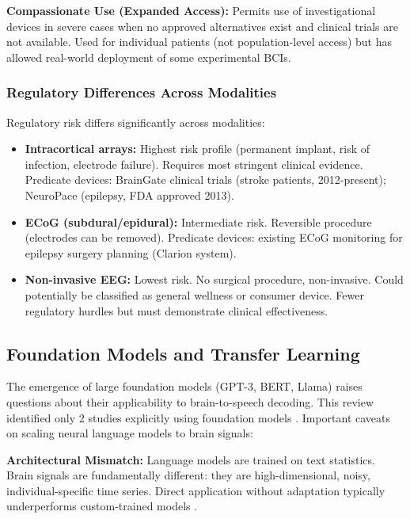 \textbf{Compassionate Use (Expanded Access):} Permits use of investigational devices in severe cases when no approved alternatives exist and clinical trials are not available. Used for individual patients (not population-level access) but has allowed real-world deployment of some experimental BCIs.

\subsubsection{Regulatory Differences Across Modalities}

Regulatory risk differs significantly across modalities:

\begin{itemize}
    \item \textbf{Intracortical arrays:} Highest risk profile (permanent implant, risk of infection, electrode failure). Requires most stringent clinical evidence. Predicate devices: BrainGate clinical trials (stroke patients, 2012-present); NeuroPace (epilepsy, FDA approved 2013).
    
    \item \textbf{ECoG (subdural/epidural):} Intermediate risk. Reversible procedure (electrodes can be removed). Predicate devices: existing ECoG monitoring for epilepsy surgery planning (Clarion system).
    
    \item \textbf{Non-invasive EEG:} Lowest risk. No surgical procedure, non-invasive. Could potentially be classified as general wellness or consumer device. Fewer regulatory hurdles but must demonstrate clinical effectiveness.
\end{itemize}

\subsection{Foundation Models and Transfer Learning}
\label{sec:foundation_models}

The emergence of large foundation models (GPT-3, BERT, Llama) raises questions about their applicability to brain-to-speech decoding. This review identified only 2 studies explicitly using foundation models \cite{Wang2023BrainBERT,Ye2025,Zhang2025CrossSpecies,Zhou2025BrainFM}. Important caveats on scaling neural language models to brain signals:

\textbf{Architectural Mismatch:} Language models are trained on text statistics. Brain signals are fundamentally different: they are high-dimensional, noisy, individual-specific time series. Direct application without adaptation typically underperforms custom-trained models \cite{Wang2023BrainBERT}.

